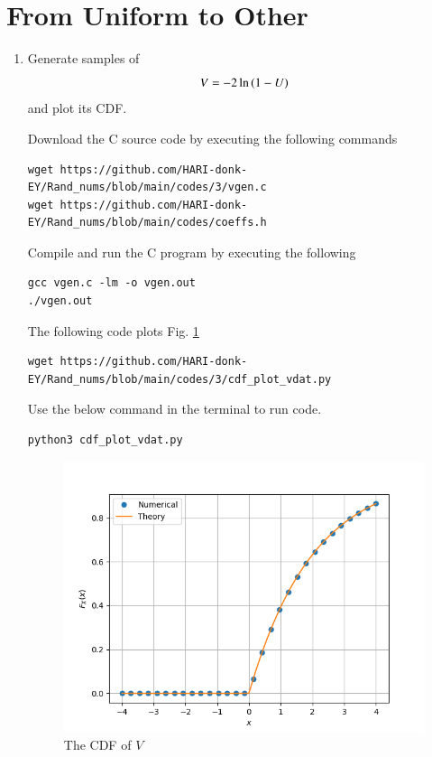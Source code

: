 \documentclass[journal,12pt,twocolumn]{IEEEtran}
\renewcommand\thesection{\arabic{section}}
\begin{document}
\section{From Uniform to Other}
\begin{enumerate}[label=\thesection.\arabic*
,ref=\thesection.\theenumi]
%
\item
Generate samples of 
%
\begin{equation}
V = -2\ln\left(1-U\right)
\end{equation}
%
and plot its CDF.  

\solution Download the C source code by executing the following commands
\begin{lstlisting}
wget https://github.com/HARI-donk-EY/Rand_nums/blob/main/codes/3/vgen.c
wget https://github.com/HARI-donk-EY/Rand_nums/blob/main/codes/coeffs.h

\end{lstlisting}
Compile and run the C program by executing the following
\begin{lstlisting}
gcc vgen.c -lm -o vgen.out
./vgen.out
\end{lstlisting}

The following code plots Fig. \ref{fig:vdat_cdf}
\begin{lstlisting}
wget https://github.com/HARI-donk-EY/Rand_nums/blob/main/codes/3/cdf_plot_vdat.py
\end{lstlisting}
Use the below command in the terminal to run code.
\begin{lstlisting}
python3 cdf_plot_vdat.py
\end{lstlisting}

\begin{figure}
\centering
\includegraphics[width=\columnwidth]{./codes/3/fig/vdat_cdf.png}
\caption{The CDF of $V$}
\label{fig:vdat_cdf}
\end{figure}


\end{enumerate}
\end{document}
